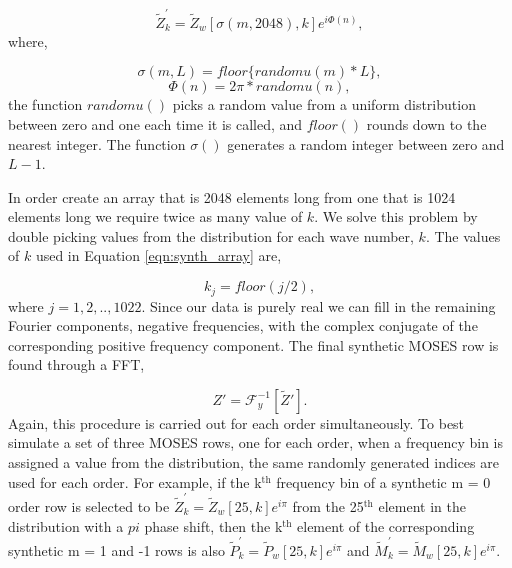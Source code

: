\documentclass[]{solarphysics}
\begin{document}
\begin{article}
	\begin{equation}
		\widetilde{Z}_k^{'} = \widetilde{Z}_w\left[\sigma(m,2048), k  \right]e^{i\Phi(n)} ,
		\label{eqn:synth_array}
	\end{equation}
	where,
	
	\begin{equation}
		\sigma(m,L) = floor\{randomu(m)*L\} ,
	\end{equation}
	\begin{equation}
		\Phi(n) = 2\pi * randomu(n),
	\end{equation}
	the function $randomu()$ picks a random value from a uniform distribution between zero and one each time it is called, and $floor()$ rounds down to the nearest integer.  The function $\sigma()$ generates a random integer between zero and $L-1$.  
	
	In order create an array that is 2048 elements long from one that is 1024 elements long we require twice as many value of $k$.  We solve this problem by double picking values from the distribution for each wave number, $k$.  The values of $k$ used in Equation \ref{eqn:synth_array} are,
	
	\begin{equation}
		k_j = floor(j/2),
	\end{equation}
	where $j = 1,2,..,1022.$ Since our data is purely real we can fill in the remaining Fourier components,  negative frequencies, with the complex conjugate of the corresponding positive frequency component.  The final synthetic MOSES row is found through a FFT, 
	
	\begin{equation}
		Z' = \mathcal{F}_y^{-1}[\widetilde{Z}'].
	\end{equation}
	Again, this procedure is carried out for each order simultaneously.  To best simulate a set of three MOSES rows, one for each order, when a frequency bin is assigned a value from the distribution, the same randomly generated indices are used for each order.  For example, if the k$^{\mathrm{th}}$ frequency bin of a synthetic m = 0 order row is selected to be $\widetilde{Z}_k^{'} = \widetilde{Z}_w\left[25, k  \right]e^{i\pi}$ from the 25$^{\mathrm{th}}$ element in the distribution with a $pi$ phase shift, then the k$^{\mathrm{th}}$ element of the corresponding synthetic m = 1 and -1 rows is also  $\widetilde{P}_k^{'} = \widetilde{P}_w\left[25, k  \right]e^{i\pi}$ and  $\widetilde{M}_k^{'} = \widetilde{M}_w\left[25, k  \right]e^{i\pi}$.
	

\end{article}
\end{document}
